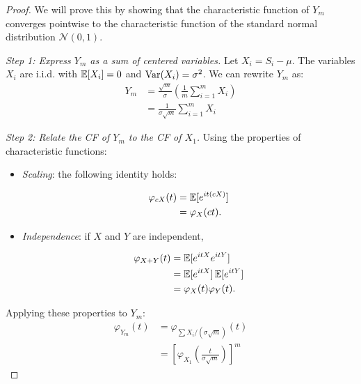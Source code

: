 \begin{proof}
We will prove this by showing that the characteristic function of $Y_m$ converges pointwise to the characteristic function of the standard normal distribution $\mathcal{N}(0,1)$.

\textit{Step 1: Express $Y_m$ as a sum of centered variables.}
Let $X_i = S_i - \mu$. The variables $X_i$ are i.i.d. with $\operatorname{\mathbb{E}}[X_i] = 0$ and $\operatorname{Var}(X_i) = \sigma^2$. We can rewrite $Y_m$ as:
\begin{equation}
\begin{aligned}
Y_m &= \frac{\sqrt{m}}{\sigma} \left( \frac{1}{m} \sum_{i=1}^m X_i \right) \\
&= \frac{1}{\sigma\sqrt{m}} \sum_{i=1}^m X_i
\end{aligned}
\end{equation}

\textit{Step 2: Relate the CF of $Y_m$ to the CF of $X_1$.}
Using the properties of characteristic functions:
\begin{itemize}
\item \textit{Scaling}: the following identity holds:

\[
\begin{aligned}
\varphi_{cX}(t) &= \operatorname{\mathbb{E}}[e^{it(cX)}] \\
&= \varphi_X(ct).
\end{aligned}
\]

\item \textit{Independence}: if $X$ and $Y$ are independent,

\[
\begin{aligned}
\varphi_{X+Y}(t) &= \operatorname{\mathbb{E}}[e^{itX}e^{itY}] \\
&= \operatorname{\mathbb{E}}[e^{itX}]\operatorname{\mathbb{E}}[e^{itY}] \\
&= \varphi_X(t)\varphi_Y(t).
\end{aligned}
\]

\end{itemize}
Applying these properties to $Y_m$:
\begin{equation}
\begin{aligned}
\varphi_{Y_m}(t) &= \varphi_{\sum X_i / (\sigma\sqrt{m})}(t) \\
&= \left[ \varphi_{X_1}\left( \frac{t}{\sigma\sqrt{m}} \right) \right]^m
\end{aligned}
\end{equation}


\end{proof}
